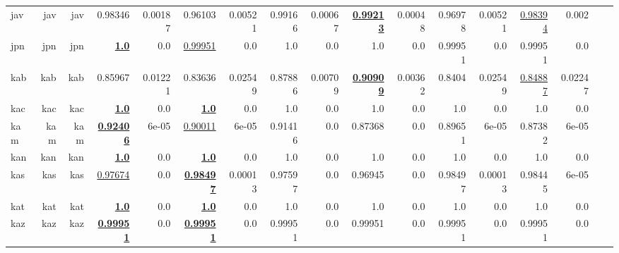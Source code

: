 \documentclass[11pt]{article}
\begin{document}
\begin{table*}[h]
{\begin{tabular}{lrrrrrrrrrrrrrrrr}
jav         & jav         & jav         & 0.98346         & 0.00187         & 0.96103         & 0.00521         & 0.99166         & 0.00067         & \textbf{\underline{0.99213}}         & 0.00048         & 0.96978         & 0.00521         & \underline{0.98394}         & 0.002         \\
jpn         & jpn         & jpn         & \textbf{\underline{1.0}}         & 0.0         & \underline{0.99951}         & 0.0         & 1.0         & 0.0         & 1.0         & 0.0         & 0.99951         & 0.0         & 0.99951         & 0.0         \\
kab         & kab         & kab         & 0.85967         & 0.01221         & 0.83636         & 0.02549         & 0.87886         & 0.00709         & \textbf{\underline{0.90909}}         & 0.00362         & 0.8404         & 0.02549         & \underline{0.84887}         & 0.02247         \\
kac         & kac         & kac         & \textbf{\underline{1.0}}         & 0.0         & \textbf{\underline{1.0}}         & 0.0         & 1.0         & 0.0         & 1.0         & 0.0         & 1.0         & 0.0         & 1.0         & 0.0         \\
kam         & kam         & kam         & \textbf{\underline{0.92406}}         & 6e-05         & \underline{0.90011}         & 6e-05         & 0.91416         & 0.0         & 0.87368         & 0.0         & 0.89651         & 6e-05         & 0.87382         & 6e-05         \\
kan         & kan         & kan         & \textbf{\underline{1.0}}         & 0.0         & \textbf{\underline{1.0}}         & 0.0         & 1.0         & 0.0         & 1.0         & 0.0         & 1.0         & 0.0         & 1.0         & 0.0         \\
kas         & kas         & kas         & \underline{0.97674}         & 0.0         & \textbf{\underline{0.98497}}         & 0.00013         & 0.97597         & 0.0         & 0.96945         & 0.0         & 0.98497         & 0.00013         & 0.98445         & 6e-05         \\
kat         & kat         & kat         & \textbf{\underline{1.0}}         & 0.0         & \textbf{\underline{1.0}}         & 0.0         & 1.0         & 0.0         & 1.0         & 0.0         & 1.0         & 0.0         & 1.0         & 0.0         \\
kaz         & kaz         & kaz         & \textbf{\underline{0.99951}}         & 0.0         & \textbf{\underline{0.99951}}         & 0.0         & 0.99951         & 0.0         & 0.99951         & 0.0         & 0.99951         & 0.0         & 0.99951         & 0.0         \\

\end{tabular}}
\end{table*}
\end{document}

